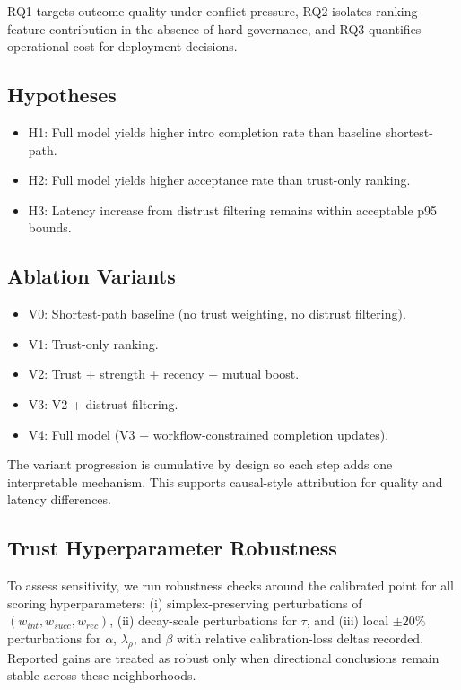 \documentclass[conference]{IEEEtran}
\begin{document}
RQ1 targets outcome quality under conflict pressure, RQ2 isolates ranking-feature contribution in the absence of hard governance, and RQ3 quantifies operational cost for deployment decisions.

\subsection{Hypotheses}
\begin{itemize}
    \item H1: Full model yields higher intro completion rate than baseline shortest-path.
    \item H2: Full model yields higher acceptance rate than trust-only ranking.
    \item H3: Latency increase from distrust filtering remains within acceptable p95 bounds.
\end{itemize}

\subsection{Ablation Variants}
\begin{itemize}
    \item V0: Shortest-path baseline (no trust weighting, no distrust filtering).
    \item V1: Trust-only ranking.
    \item V2: Trust + strength + recency + mutual boost.
    \item V3: V2 + distrust filtering.
    \item V4: Full model (V3 + workflow-constrained completion updates).
\end{itemize}

The variant progression is cumulative by design so each step adds one interpretable mechanism. This supports causal-style attribution for quality and latency differences.

\subsection{Trust Hyperparameter Robustness}
To assess sensitivity, we run robustness checks around the calibrated point for all scoring hyperparameters: (i) simplex-preserving perturbations of $(w_{int},w_{succ},w_{rec})$, (ii) decay-scale perturbations for $\tau$, and (iii) local \(\pm 20\%\) perturbations for $\alpha$, $\lambda_{\rho}$, and $\beta$ with relative calibration-loss deltas recorded. Reported gains are treated as robust only when directional conclusions remain stable across these neighborhoods.
\end{document}
